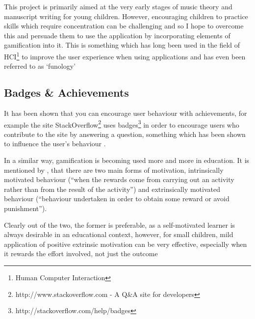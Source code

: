 This project is primarily aimed at the very early stages of music theory and manuscript writing for young children. However, encouraging children to practice skills which require concentration can be challenging and so I hope to overcome this and persuade them to use the application by incorporating elements of gamification into it. This is something which has long been used in the field of HCI\footnote{Human Computer Interaction} to improve the user experience when using applications and has even been referred to as `funology' \parencite{blythe2004funology}

\subsection*{Badges \& Achievements}
It has been shown that you can encourage user behaviour with achievements, for example the site StackOverflow\footnote{http://www.stackoverflow.com - A Q\&A site for developers} uses badges\footnote{http://stackoverflow.com/help/badges} in order to encourage users who contribute to the site by answering a question, something which has been shown to influence the user's behaviour \parencite{MSR13p65}.

In a similar way, gamification is becoming used more and more in education. It is mentioned by \citeauthor{kapp2012gamification}\cite{kapp2012gamification}, that there are two main forms of motivation, intrinsically motivated behaviour (\enquote{when the rewards come from carrying out an activity rather than from the result of the activity}) and extrinsically motivated behaviour (\enquote{behaviour undertaken in order to obtain some reward or avoid punishment}).

Clearly out of the two, the former is preferable, as a self-motivated learner is always desirable in an educational context, however, for small children, mild application of positive extrinsic motivation can be very effective, especially when it rewards the effort involved, not just the outcome \parencite{motivate-kids-lifehacker}\cite{motivate-kids-lifehacker}
